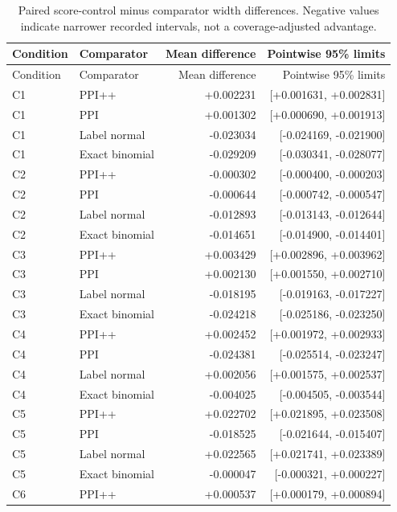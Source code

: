 \documentclass{article}
\begin{document}
\begin{longtable}{llrr}
\caption{Paired score-control minus comparator width differences. Negative values indicate narrower recorded intervals, not a coverage-adjusted advantage.}\label{tab:paired}\\
\toprule
Condition & Comparator & Mean difference & Pointwise 95\% limits\\
\midrule
\endfirsthead
\toprule
Condition & Comparator & Mean difference & Pointwise 95\% limits\\
\midrule
\endhead
C1 & PPI++ & +0.002231 & [+0.001631, +0.002831] \\
C1 & PPI & +0.001302 & [+0.000690, +0.001913] \\
C1 & Label normal & -0.023034 & [-0.024169, -0.021900] \\
C1 & Exact binomial & -0.029209 & [-0.030341, -0.028077] \\
\midrule
C2 & PPI++ & -0.000302 & [-0.000400, -0.000203] \\
C2 & PPI & -0.000644 & [-0.000742, -0.000547] \\
C2 & Label normal & -0.012893 & [-0.013143, -0.012644] \\
C2 & Exact binomial & -0.014651 & [-0.014900, -0.014401] \\
\midrule
C3 & PPI++ & +0.003429 & [+0.002896, +0.003962] \\
C3 & PPI & +0.002130 & [+0.001550, +0.002710] \\
C3 & Label normal & -0.018195 & [-0.019163, -0.017227] \\
C3 & Exact binomial & -0.024218 & [-0.025186, -0.023250] \\
\midrule
C4 & PPI++ & +0.002452 & [+0.001972, +0.002933] \\
C4 & PPI & -0.024381 & [-0.025514, -0.023247] \\
C4 & Label normal & +0.002056 & [+0.001575, +0.002537] \\
C4 & Exact binomial & -0.004025 & [-0.004505, -0.003544] \\
\midrule
C5 & PPI++ & +0.022702 & [+0.021895, +0.023508] \\
C5 & PPI & -0.018525 & [-0.021644, -0.015407] \\
C5 & Label normal & +0.022565 & [+0.021741, +0.023389] \\
C5 & Exact binomial & -0.000047 & [-0.000321, +0.000227] \\
\midrule
C6 & PPI++ & +0.000537 & [+0.000179, +0.000894] \\

\end{longtable}
\end{document}
